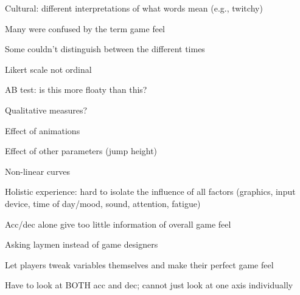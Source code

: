 Cultural: different interpretations of what words mean (e.g., twitchy)

Many were confused by the term game feel

Some couldn't distinguish between the different times

Likert scale not ordinal

AB test: is this more floaty than this?

Qualitative measures?

Effect of animations

Effect of other parameters (jump height)

Non-linear curves

Holistic experience: hard to isolate the influence of all factors (graphics, input device, time of day/mood, sound, attention, fatigue)

Acc/dec alone give too little information of overall game feel

Asking laymen instead of game designers

Let players tweak variables themselves and make their perfect game feel

Have to look at BOTH acc and dec; cannot just look at one axis individually